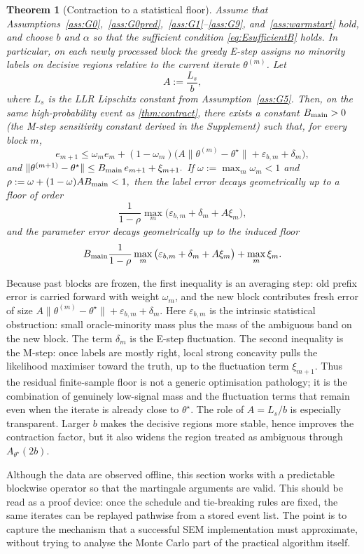 \documentclass{statsoc}
\newtheorem{theorem}{Theorem}[section]
\newcommand{\1}{\mathbbm{1}}
\begin{document}
\begin{theorem}[Contraction to a statistical floor]\label{thm:sec-contraction}
Assume that Assumptions~\ref{ass:G0},~\ref{ass:G0pred},~\ref{ass:G1}--\ref{ass:G9}, and~\ref{ass:warmstart} hold, and choose \(b\) and \(\alpha\) so that the sufficient condition \eqref{eq:EsufficientB} holds. In particular, on each newly processed block the greedy E-step assigns no minority labels on decisive regions relative to the current iterate \(\theta^{(m)}\). Let
\[
A:=\frac{L_s}{b},
\]
where \(L_s\) is the LLR Lipschitz constant from Assumption~\ref{ass:G5}. Then, on the same high-probability event as \cref{thm:contract}, there exists a constant \(B_{\rm main}>0\) (the M-step sensitivity constant derived in the Supplement) such that, for every block \(m\),
\[
e_{m+1}
\le
\omega_m e_m
+
(1-\omega_m)\Big(A\|\theta^{(m)}-\theta^\star\|+\varepsilon_{b,m}+\delta_m\Big),
\]
and
\(
\|\theta^{(m+1)}-\theta^\star\|
\le
B_{\rm main}\,e_{m+1}+\xi_{m+1}.
\)
If \(\omega:=\max_m\omega_m<1\) and
\(
\rho:=\omega+(1-\omega)AB_{\rm main}<1,
\)
then the label error decays geometrically up to a floor of order
\[
\frac{1}{1-\rho}\max_m\big(\varepsilon_{b,m}+\delta_m+A\xi_m\big),
\]
and the parameter error decays geometrically up to the induced floor
\[
B_{\rm main}\frac{1}{1-\rho}\max_m\big(\varepsilon_{b,m}+\delta_m+A\xi_m\big)+\max_m\xi_m.
\]
\end{theorem}

Because past blocks are frozen, the first inequality is an averaging step: old prefix error is carried forward with weight \(\omega_m\), and the new block contributes fresh error of size
\(
A\|\theta^{(m)}-\theta^\star\|+\varepsilon_{b,m}+\delta_m.
\)
Here \(\varepsilon_{b,m}\) is the intrinsic statistical obstruction: small oracle-minority mass plus the mass of the ambiguous band on the new block. The term \(\delta_m\) is the E-step fluctuation. The second inequality is the M-step: once labels are mostly right, local strong concavity pulls the likelihood maximiser toward the truth, up to the fluctuation term \(\xi_{m+1}\). Thus the residual finite-sample floor is not a generic optimisation pathology; it is the combination of genuinely low-signal mass and the fluctuation terms that remain even when the iterate is already close to \(\theta^\star\). The role of \(A=L_s/b\) is especially transparent. Larger \(b\) makes the decisive regions more stable, hence improves the contraction factor, but it also widens the region treated as ambiguous through \(A_{\theta^\star}(2b)\). 

Although the data are observed offline, this section works with a predictable blockwise operator so that the martingale arguments are valid. This should be read as a proof device: once the schedule and tie-breaking rules are fixed, the same iterates can be replayed pathwise from a stored event list. The point is to capture the mechanism that a successful SEM implementation must approximate, without trying to analyse the Monte Carlo part of the practical algorithm itself.
\end{document}
